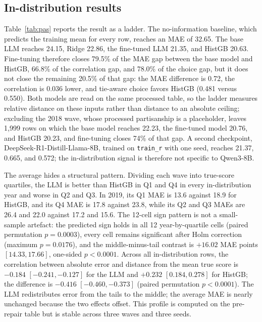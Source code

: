 \subsection{In-distribution results}\label{in-distribution-results}

Table~\ref{tab:pas} reports the result as a ladder. The no-information baseline,
which predicts the training mean for every row, reaches an MAE of 32.65.
The base LLM reaches 24.15, Ridge 22.86, the fine-tuned LLM 21.35, and
HistGB 20.63. Fine-tuning therefore closes 79.5\% of the MAE gap between
the base model and HistGB, 66.8\% of the correlation gap, and 78.0\% of
the choice gap, but it does not close the remaining 20.5\% of that gap:
the MAE difference is 0.72, the correlation is 0.036 lower, and
tie-aware choice favors HistGB (0.481 versus 0.550). Both models are
read on the same processed table, so the ladder measures relative
distance on these inputs rather than distance to an absolute ceiling;
excluding the 2018 wave, whose processed partisanship is a placeholder,
leaves 1,999 rows on which the base model reaches 22.23, the fine-tuned
model 20.76, and HistGB 20.23, and fine-tuning closes 74\% of that gap.
A second checkpoint, DeepSeek-R1-Distill-Llama-8B, trained on
\texttt{train\_r} with one seed, reaches 21.37, 0.665, and 0.572; the
in-distribution signal is therefore not specific to Qwen3-8B.




The average hides a structural pattern. Dividing each wave into
true-score quartiles, the LLM is better than HistGB in Q1 and Q4 in
every in-distribution year and worse in Q2 and Q3. In 2019, its Q1 MAE
is 13.6 against 18.9 for HistGB, and its Q4 MAE is 17.8 against 23.8,
while its Q2 and Q3 MAEs are 26.4 and 22.0 against 17.2 and 15.6. The
12-cell sign pattern is not a small-sample artefact: the predicted sign
holds in all 12 year-by-quartile cells (paired permutation
\(p=0.0003\)), every cell remains significant after Holm correction
(maximum \(p=0.0176\)), and the middle-minus-tail contrast is \(+16.02\)
MAE points \([14.33, 17.66]\), one-sided \(p<0.0001\). Across all
in-distribution rows, the correlation between absolute error and
distance from the mean true score is \(-0.184\) \([-0.241,-0.127]\) for
the LLM and \(+0.232\) \([0.184,0.278]\) for HistGB; the difference is
\(-0.416\) \([-0.460,-0.373]\) (paired permutation \(p<0.0001\)). The
LLM redistributes error from the tails to the middle; the average MAE is
nearly unchanged because the two effects offset. This profile is
computed on the pre-repair table but is stable across three waves and
three seeds.

